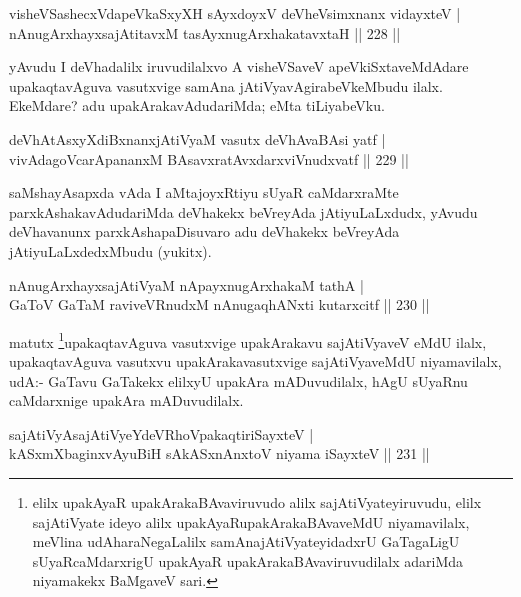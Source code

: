 \begin{shl}
visheVSashecxVdapeVkaSxyXH sAyxdoyxV deVheV\s simxnanx vidayxteV | \\
nAnugArxhayxsajAtitavxM tasAyxnugArxhakatavxtaH \hfill ||  228 ||  
\end{shl}

\begin{artha}
yAvudu I deVhadalilx iruvudilalxvo A visheVSaveV apeVkiSxtaveMdAdare upakaqtavAguva vasutxvige samAna jAtiVyavAgirabeVkeMbudu ilalx. EkeMdare? adu upakArakavAdudariMda; eMta tiLiyabeVku.
\end{artha}


\begin{shl}
deVhAtAsxyXdiBxnanxjAtiVyaM vasutx deVhAvaBAsi yatf | \\
vivAdagoVcarApananxM BAsavxratAvxdarxviVnudxvatf \hfill ||  229 ||  
\end{shl}

\begin{artha}
saMshayAsapxda vAda I aMtajoyxRtiyu sUyaR caMdarxraMte parxkAshakavAdudariMda deVhakekx beVreyAda jAtiyuLaLxdudx, yAvudu deVhavanunx parxkAshapaDisuvaro adu deVhakekx beVreyAda jAtiyuLaLxdedxMbudu (yukitx).
\end{artha}

\begin{shl}
nAnugArxhayxsajAtiVyaM nApayxnugArxhakaM tathA | \\
GaToV GaTaM raviveVRnudxM nAnugaqhANxti kutarxcitf \hfill ||  230 ||  
\end{shl}

\begin{artha}
matutx \footnote{elilx upakAyaR upakArakaBAvaviruvudo alilx sajAtiVyateyiruvudu, elilx sajAtiVyate ideyo alilx upakAyaRupakArakaBAvaveMdU niyamavilalx, meVlina udAharaNegaLalilx samAnajAtiVyateyidadxrU GaTagaLigU sUyaRcaMdarxrigU upakAyaR upakArakaBAvaviruvudilalx adariMda niyamakekx BaMgaveV sari.}upakaqtavAguva vasutxvige upakArakavu sajAtiVyaveV eMdU ilalx, upakaqtavAguva vasutxvu upakArakavasutxvige sajAtiVyaveMdU niyamavilalx, udA:- GaTavu GaTakekx elilxyU upakAra mADuvudilalx, hAgU sUyaRnu caMdarxnige upakAra mADuvudilalx.
\end{artha}

\begin{shl}
sajAtiVyAsajAtiVyeYdeVRhoVpakaqtiriSayxteV | \\
\footnotemark[1]{}kASxmXbaginxvAyuBiH sAkASxnAnxtoV niyama iSayxteV \hfill ||  231 ||  
\end{shl}

